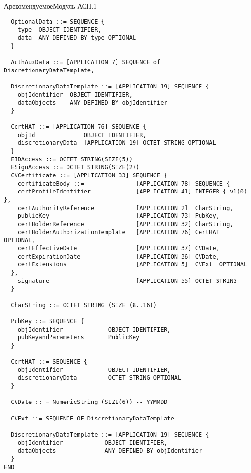 \begin{appendix}{А}{рекомендуемое}{Модуль АСН.1}
\begin{verbatim}
  OptionalData ::= SEQUENCE {
    type  OBJECT IDENTIFIER,
    data  ANY DEFINED BY type OPTIONAL
  }

  AuthAuxData ::= [APPLICATION 7] SEQUENCE of DiscretionaryDataTemplate;

  DiscretionaryDataTemplate ::= [APPLICATION 19] SEQUENCE {
    objIdentifier  OBJECT IDENTIFIER,
    dataObjects    ANY DEFINED BY objIdentifier
  }

  CertHAT ::= [APPLICATION 76] SEQUENCE {
    objId              OBJECT IDENTIFIER,
    discretionaryData  [APPLICATION 19] OCTET STRING OPTIONAL
  }
  EIDAccess ::= OCTET STRING(SIZE(5))
  ESignAccess ::= OCTET STRING(SIZE(2))
  CVCertificate ::= [APPLICATION 33] SEQUENCE {
    certificateBody ::=               [APPLICATION 78] SEQUENCE {
    certProfileIdentifier             [APPLICATION 41] INTEGER { v1(0) },
    certAuthorityReference            [APPLICATION 2]  CharString,
    publicKey                         [APPLICATION 73] PubKey,
    certHolderReference               [APPLICATION 32] CharString,
    certHolderAuthorizationTemplate   [APPLICATION 76] CertHAT  OPTIONAL,
    certEffectiveDate                 [APPLICATION 37] CVDate,
    certExpirationDate                [APPLICATION 36] CVDate,
    certExtensions                    [APPLICATION 5]  CVExt  OPTIONAL
  },
    signature                         [APPLICATION 55] OCTET STRING
  }

  CharString ::= OCTET STRING (SIZE (8..16))

  PubKey ::= SEQUENCE {
    objIdentifier             OBJECT IDENTIFIER,
    pubKeyandParameters       PublicKey 
  }

  CertHAT ::= SEQUENCE {
    objIdentifier             OBJECT IDENTIFIER,
    discretionaryData         OCTET STRING OPTIONAL
  }

  CVDate :: = NumericString (SIZE(6)) -- YYMMDD

  CVExt ::= SEQUENCE OF DiscretionaryDataTemplate

  DiscretionaryDataTemplate ::= [APPLICATION 19] SEQUENCE {
    objIdentifier            OBJECT IDENTIFIER,
    dataObjects              ANY DEFINED BY objIdentifier
  }
END
\end{verbatim}

\end{appendix}

